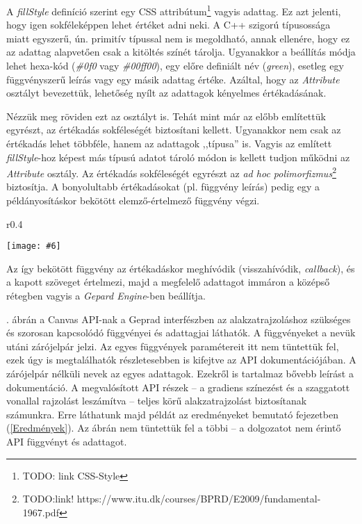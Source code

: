 \documentclass[12pt]{report}
\makeatletter
\theoremstyle{definition}
\newcommand{\inenglish}[1]{\textsl{#1}}
\newcommand{\func}[1]{{\textsl{#1}}}
\newcommand{\melyikoldalra}{r}
\newlength{\Xoffset}
\newlength{\Yoffset}
\newcommand*{\setpdfoffset}[2]{%
  \setlength{\Xoffset}{#1}%
  \setlength{\Yoffset}{#2}%
}
\newcommand*{\setviewport}[4]{%
  \def\x@viewport{%
    {\the\dimexpr#1-\Xoffset}
    {\the\dimexpr#2-\Yoffset}
    {\the\dimexpr#3-\Xoffset}
    {\the\dimexpr#4-\Yoffset}%
  }%
}
\newcommand{\includegraphicskivagas}[6]{
    \setpdfoffset{0pt}{0pt}
    \setviewport{#1}{#2}{#3}{#4}
    \texttt{[image: \#6]}
}
\newcommand{\includedataflowkivagas}[5]{
    \includegraphicskivagas{#1}{#2}{#3}{#4}{scale=0.6,#5}
    {img/built/dataflow_eps}
}
\makeatother
\begin{document}
A \func{fillStyle} definíció szerint egy CSS attribútum\footnote{TODO: link
CSS-Style} vagyis adattag. Ez azt jelenti, hogy igen sokféleképpen lehet
értéket adni neki. A C++ szigorú típusossága miatt egyszerű, ún. primitív
típussal nem is megoldható, annak ellenére, hogy ez az adattag alapvetően csak
a kitöltés színét tárolja. Ugyanakkor a beállítás módja lehet hexa-kód
(\func{\#0f0} vagy \func{\#00ff00}), egy előre definiált név (\func{green}),
esetleg egy függvényszerű leírás vagy egy másik adattag értéke. Azáltal, hogy
az \func{Attribute} osztályt bevezettük, lehetőség nyílt az adattagok kényelmes
értékadásának.

Nézzük meg röviden ezt az osztályt is. Tehát mint már az előbb említettük
egyrészt, az értékadás sokféleségét biztosítani kellett. Ugyanakkor nem csak az
értékadás lehet többféle, hanem az adattagok ,,típusa'' is. Vagyis az említett
\func{fillStyle}-hoz képest más típusú adatot tároló módon is kellett tudjon
működni az \func{Attribute} osztály. Az értékadás sokféleségét egyrészt az
\emph{ad hoc polimorfizmus}\footnote{TODO:link!
https://www.itu.dk/courses/BPRD/E2009/fundamental-1967.pdf} biztosítja. A
bonyolultabb értékadásokat (pl. függvény leírás) pedig egy a példányosításkor
bekötött elemző-értelmező függvény végzi.
  \begin{wrapfigure}{\melyikoldalra}{0.4\textwidth}
    \begin{center}
      \includedataflowkivagas{0pt}{210pt}{160pt}{590pt}{}
    \end{center}
    \caption{\label{dataflow-API-diagram} A \emph{felső} réteg (Gepard
    interfész) függvényei és adattagjai. \\ (Részlet a
    \emph{\ref{dataflow}. folyamatábrából}.)}
  \end{wrapfigure}
Az így bekötött függvény az értékadáskor meghívódik (visszahívódik,
\inenglish{callback}), és a kapott szöveget értelmezi, majd a megfelelő
adattagot immáron a középső rétegben vagyis a \func{Gepard Engine}-ben
beállítja.

. ábrán a Canvas API-nak a Geprad interfészben az
alakzatrajzoláshoz szükséges és szorosan kapcsolódó függvényei és adattagjai
láthatók. A függvényeket a nevük utáni zárójelpár jelzi. Az egyes függvények
paramétereit itt nem tüntettük fel, ezek úgy is megtalálhatók részletesebben is
kifejtve az API dokumentációjában. A zárójelpár nélküli nevek az egyes
adattagok. Ezekről is tartalmaz bővebb leírást a dokumentáció. A megvalósított
API részek -- a gradiens színezést és a szaggatott vonallal rajzolást
leszámítva -- teljes körű alakzatrajzolást biztosítanak számunkra. Erre
láthatunk majd példát az eredményeket bemutató fejezetben (\ref{Eredmények}).
Az ábrán nem tüntettük fel a többi -- a dolgozatot nem érintő API függvényt és
adattagot.
\end{document}
